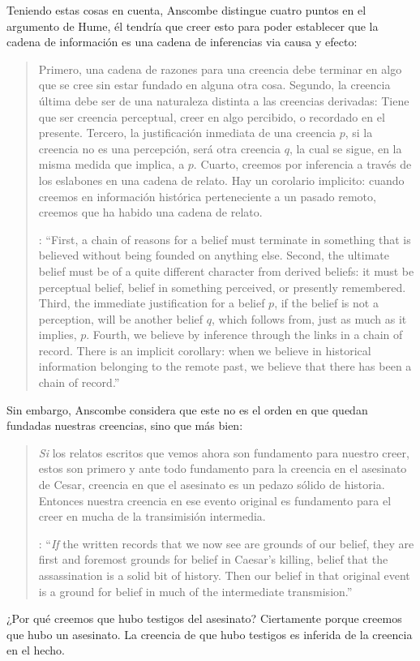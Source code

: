Teniendo estas cosas en cuenta, Anscombe distingue cuatro puntos en el argumento de Hume, él tendría que creer esto para poder establecer que la cadena de información es una cadena de inferencias via causa y efecto: \blockquote[{\cite[88]{anscombe1981parmenides:humeandjulius}}: \enquote{First, a chain of reasons for a belief must terminate in something that is believed without being founded on anything else. Second, the ultimate belief must be of a quite different character from derived beliefs: it must be perceptual belief, belief in something perceived, or presently remembered. Third, the immediate justification for a belief $p$, if the belief is not a perception, will be another belief $q$, which follows from, just as much as it implies, $p$. Fourth, we believe by inference through the links in a chain of record.   There is an implicit corollary: when we believe in historical information belonging to the remote past, we believe that there has been a chain of record.}]{Primero, una cadena de razones para una creencia debe terminar en algo que se cree sin estar fundado en alguna otra cosa. Segundo, la creencia última debe ser de una naturaleza distinta a las creencias derivadas: Tiene que ser creencia perceptual, creer en algo percibido, o recordado en el presente. Tercero, la justificación inmediata de una creencia $p$, si la creencia no es una percepción, será otra creencia $q$, la cual se sigue, en la misma medida que implica, a $p$. Cuarto, creemos por inferencia a través de los eslabones en una cadena de relato. Hay un corolario implicito: cuando creemos en información histórica perteneciente a un pasado remoto, creemos que ha habido una cadena de relato.}

Sin embargo, Anscombe considera que este no es el orden en que quedan fundadas nuestras creencias, sino que más bien: \blockquote[{\cite[88]{anscombe1981parmenides:humeandjulius}}: \enquote{\emph{If} the written records that we now see are grounds of our belief, they are first and foremost grounds for belief in Caesar's killing, belief that the assassination is a solid bit of history. Then our belief in that original event is a ground for belief in much of the intermediate transmision.}]{\emph{Si} los relatos escritos que vemos ahora son fundamento para nuestro creer, estos son primero y ante todo fundamento para la creencia en el asesinato de Cesar, creencia en que el asesinato es un pedazo sólido de historia. Entonces nuestra creencia en ese evento original es fundamento para el creer en mucha de la transimisión intermedia.} ¿Por qué creemos que hubo testigos del asesinato? Ciertamente porque creemos que hubo un asesinato. La creencia de que hubo testigos es inferida de la creencia en el hecho.

